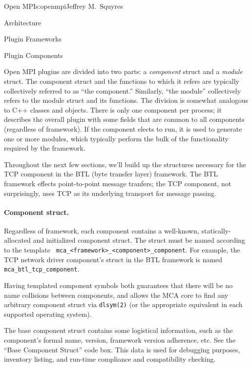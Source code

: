 \begin{aosachapter}{Open MPI}{s:openmpi}{Jeffrey M.\ Squyres}
\begin{aosasect1}{Architecture}
\begin{aosasect2}{Plugin Frameworks}
\end{aosasect2}


\begin{aosasect2}{Plugin Components}

Open MPI plugins are divided into two parts: a \emph{component}
struct and a \emph{module} struct.
%
The component struct and the functions to which it refers are
typically collectively referred to as ``the component.''  Similarly,
``the module'' collectively refers to the module struct and its
functions.
%
The division is somewhat analogous to C++ classes and objects.
%
There is only one component per process; it describes the overall
plugin with some fields that are common to all components (regardless
of framework).
%
If the component elects to run, it is used to generate one or more
modules, which typically perform the bulk of the functionality
required by the framework.

Throughout the next few sections, we'll build up the structures
necessary for the TCP component in the BTL (byte transfer layer)
framework.  The BTL framework effects point-to-point message tranfers;
the TCP component, not surprisingly, uses TCP as its underlying
transport for message passing.


\paragraph{Component struct.} 

Regardless of framework, each component contains a well-known,
statically-allocated and initialized component struct.  
%
The struct must be named according to the template {\tt
  mca\_\-<framework>\_\-<component>\_\-component}.  For example, the
TCP network driver component's struct in the BTL framework is named
{\tt mca\_\-btl\_\-tcp\_\-component}.

Having templated component symbols both guarantees that there will be
no name collisions between components, and allows the MCA core to find
any arbitrary component struct via {\tt dlsym(2)} (or the appropriate
equivalent in each supported operating system).

The base component struct contains some logistical information, such
as the component's formal name, version, framework version adherence,
etc.  See the ``Base Component Struct'' code box.
%
This data is used for debugging purposes, inventory listing, and
run-time compliance and compatibility checking.


\end{aosasect2}
\end{aosasect1}
\end{aosachapter}
